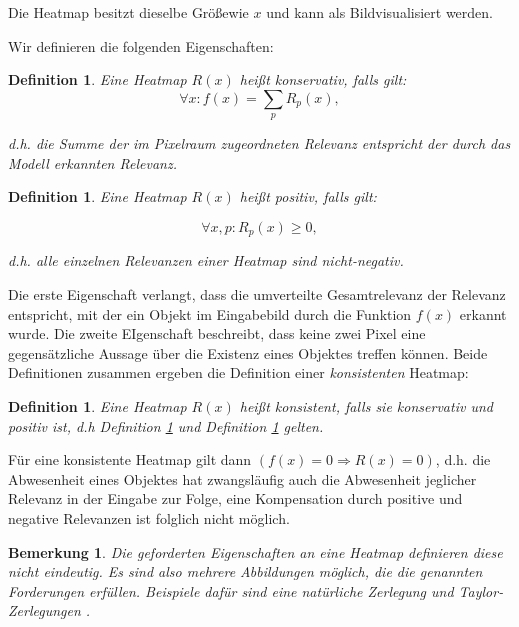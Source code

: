 \documentclass[twoside, 11pt,a4paper]{article}
\def\emph#1{\textit{#1}}
\newtheorem{definition}[theorem]{Definition}
\newtheorem{remark}[theorem]{Bemerkung}
\numberwithin{equation}{section}
\begin{document}
	Die Heatmap besitzt dieselbe Größewie $x$ und kann als Bildvisualisiert werden.
	
	Wir definieren die folgenden Eigenschaften:
	
	\begin{definition}\label{def_konservativ}
		Eine Heatmap $R(x)$ heißt \emph{konservativ}, falls gilt:
		\begin{equation}
			\forall x: f(x) = \sum_p R_p(x),
		\end{equation}
		
		d.h. die Summe der im Pixelraum zugeordneten Relevanz entspricht der durch das Modell erkannten Relevanz.
	\end{definition}
	
	
	\begin{definition} \label{def_pos}
		Eine Heatmap $R(x)$ heißt \emph{positiv}, falls gilt:
		
		\begin{equation}
			\forall x,p: R_p(x) \geq 0,
		\end{equation}
		
		d.h. alle einzelnen Relevanzen einer Heatmap sind nicht-negativ.
		
	\end{definition}
	
	Die erste Eigenschaft verlangt, dass die umverteilte Gesamtrelevanz der Relevanz entspricht, mit der ein Objekt im Eingabebild durch die Funktion $f(x)$ erkannt wurde.
	Die zweite EIgenschaft beschreibt, dass keine zwei Pixel eine gegensätzliche Aussage über die Existenz eines Objektes treffen können. Beide Definitionen zusammen ergeben die Definition einer \textit{konsistenten} Heatmap:
	
	\begin{definition}
		Eine Heatmap $R(x)$ heißt \emph{konsistent}, falls sie konservativ und positiv ist, d.h Definition \ref{def_konservativ} und Definition \ref{def_pos} gelten.
	\end{definition}

Für eine konsistente Heatmap gilt dann $(f(x) = 0 \Rightarrow R(x) = 0)$, d.h. die Abwesenheit eines Objektes hat zwangsläufig auch die Abwesenheit jeglicher Relevanz in der Eingabe zur Folge, eine Kompensation durch positive und negative Relevanzen ist folglich nicht möglich.

\begin{remark}
	Die geforderten Eigenschaften an eine Heatmap definieren diese nicht eindeutig. Es sind also mehrere Abbildungen möglich, die die genannten Forderungen erfüllen. Beispiele dafür sind eine natürliche Zerlegung und Taylor-Zerlegungen \cite{dtd_paper}.
\end{remark}
\end{document}
